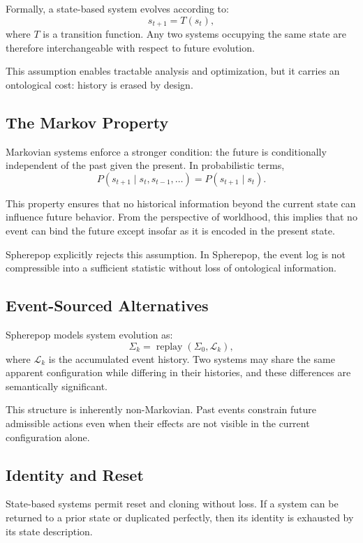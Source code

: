 \documentclass[11pt]{article}
\begin{document}
Formally, a state-based system evolves according to:
\[
s_{t+1} = T(s_t),
\]
where $T$ is a transition function. Any two systems occupying the same state are therefore interchangeable with respect to future evolution.

This assumption enables tractable analysis and optimization, but it carries an ontological cost: history is erased by design.

\subsection{The Markov Property}

Markovian systems enforce a stronger condition: the future is conditionally independent of the past given the present. In probabilistic terms,
\[
P(s_{t+1} \mid s_t, s_{t-1}, \dots) = P(s_{t+1} \mid s_t).
\]

This property ensures that no historical information beyond the current state can influence future behavior. From the perspective of worldhood, this implies that no event can bind the future except insofar as it is encoded in the present state.

Spherepop explicitly rejects this assumption. In Spherepop, the event log is not compressible into a sufficient statistic without loss of ontological information.

\subsection{Event-Sourced Alternatives}

Spherepop models system evolution as:
\[
\Sigma_k = \operatorname{replay}(\Sigma_0, \mathcal{L}_k),
\]
where $\mathcal{L}_k$ is the accumulated event history. Two systems may share the same apparent configuration while differing in their histories, and these differences are semantically significant.

This structure is inherently non-Markovian. Past events constrain future admissible actions even when their effects are not visible in the current configuration alone.

\subsection{Identity and Reset}

State-based systems permit reset and cloning without loss. If a system can be returned to a prior state or duplicated perfectly, then its identity is exhausted by its state description.
\end{document}
